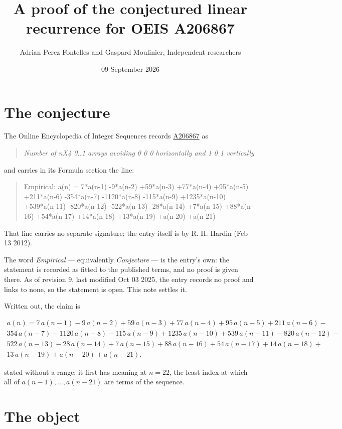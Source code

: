 \documentclass[11pt]{article}
\title{A proof of the conjectured linear recurrence for OEIS A206867}
\author{Adrian Perez Fontelles and Gaspard Moulinier, Independent researchers}
\date{09 September 2026}
\theoremstyle{definition}
\begin{document}
\maketitle
\section{The conjecture}

The Online Encyclopedia of Integer Sequences records \href{https://oeis.org/A206867}{A206867} as

\begin{quote}\itshape Number of nX4 0..1 arrays avoiding 0 0 0 horizontally and 1 0 1 vertically\end{quote}

and carries in its Formula section the line:

\begin{quote}\ttfamily Empirical: a(n) = 7*a(n-1) -9*a(n-2) +59*a(n-3) +77*a(n-4) +95*a(n-5) +211*a(n-6) -354*a(n-7) -1120*a(n-8) -115*a(n-9) +1235*a(n-10) +539*a(n-11) -820*a(n-12) -522*a(n-13) -28*a(n-14) +7*a(n-15) +88*a(n-16) +54*a(n-17) +14*a(n-18) +13*a(n-19) +a(n-20) +a(n-21)\end{quote}

That line carries no separate signature; the entry itself is by R. H. Hardin (Feb 13 2012).

The word {\itshape Empirical} --- equivalently {\itshape Conjecture} --- is the entry's own: the statement is recorded as fitted to the published terms, and no proof is given there. As of revision 9, last modified Oct 03 2025, the entry records no proof and links to none, so the statement is open. This note settles it.

Written out, the claim is

\begin{multline*} a(n) = 7\,a(n-1) - 9\,a(n-2) + 59\,a(n-3) + 77\,a(n-4) + 95\,a(n-5) + 211\,a(n-6) - \\ 354\,a(n-7) - 1120\,a(n-8) - 115\,a(n-9) + 1235\,a(n-10) + 539\,a(n-11) - 820\,a(n-12) - \\ 522\,a(n-13) - 28\,a(n-14) + 7\,a(n-15) + 88\,a(n-16) + 54\,a(n-17) + 14\,a(n-18) + \\ 13\,a(n-19) + a(n-20) + a(n-21). \end{multline*}

stated without a range; it first has meaning at $n = 22$, the least index at which all of $a(n-1),\dots,a(n-21)$ are terms of the sequence.

\section{The object}
\end{document}
